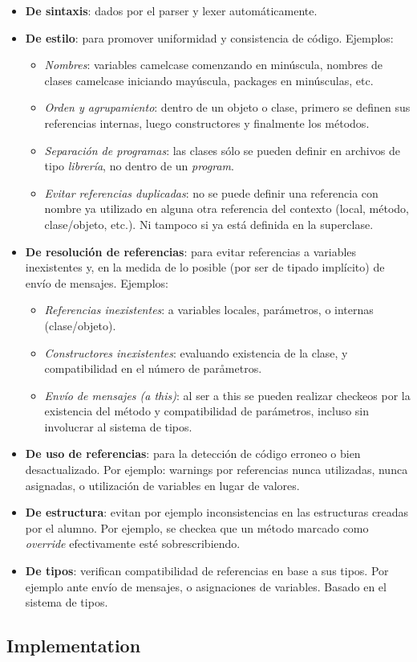 \begin{itemize}
  \item \textbf{De sintaxis}: dados por el parser y lexer automáticamente.
  \item \textbf{De estilo}: para promover uniformidad y consistencia de código.
  Ejemplos:
  		\begin{itemize}
  			\item \textit{Nombres}: variables camelcase comenzando en minúscula,
  			nombres de clases camelcase iniciando mayúscula, packages en minúsculas, etc.
  			\item \textit{Orden y agrupamiento}: dentro de un objeto o clase, primero
  			se definen sus referencias internas, luego constructores y finalmente los métodos.
  			\item \textit{Separación de programas}: las clases sólo se pueden definir
  			en archivos de tipo \textit{librería}, no dentro de un \textit{program}.
  			\item \textit{Evitar referencias duplicadas}: no se puede definir una
  			referencia con nombre ya utilizado en alguna otra referencia del contexto (local, método,
  			clase/objeto, etc.). Ni tampoco si ya está definida en la superclase.
		\end{itemize}
  \item \textbf{De resolución de referencias}: para evitar referencias a
  variables inexistentes y, en la medida de lo posible (por ser de tipado
  implícito) de envío de mensajes. Ejemplos:
  		\begin{itemize}
		  \item \textit{Referencias inexistentes}: a variables locales, parámetros, o
		  internas (clase/objeto).
		  \item \textit{Constructores inexistentes}: evaluando existencia de la
		  clase, y compatibilidad en el número de paråmetros.
		  \item \textit{Envío de mensajes (a this)}: al ser a this se pueden realizar
		  checkeos por la existencia del método y compatibilidad de parámetros, incluso sin
		  involucrar al sistema de tipos.
		\end{itemize}
  \item \textbf{De uso de referencias}: para la detección de código
  	erroneo o bien desactualizado. Por ejemplo: warnings por referencias nunca
 	utilizadas, nunca asignadas, o utilización de variables en lugar de valores.
  \item \textbf{De estructura}: evitan por ejemplo inconsistencias en las
  estructuras creadas por el alumno. Por ejemplo, se checkea
  que un método marcado como \textit{override} efectivamente esté
  sobrescribiendo.
  \item \textbf{De tipos}: verifican compatibilidad de referencias en base a sus
  tipos. Por ejemplo ante envío de mensajes, o asignaciones de variables. Basado
  en el sistema de tipos.
\end{itemize}


\subsection{Implementation}
